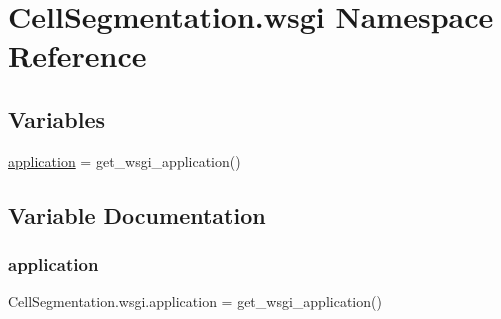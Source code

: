 \hypertarget{namespace_cell_segmentation_1_1wsgi}{}\section{Cell\+Segmentation.\+wsgi Namespace Reference}
\label{namespace_cell_segmentation_1_1wsgi}
\subsection*{Variables}
\begin{DoxyCompactItemize}
\item 
\mbox{\hyperlink{namespace_cell_segmentation_1_1wsgi_ae09dc9003f187d25053773e22660fb2a}{application}} = get\+\_\+wsgi\+\_\+application()
\end{DoxyCompactItemize}


\subsection{Variable Documentation}
\mbox{\label{namespace_cell_segmentation_1_1wsgi_ae09dc9003f187d25053773e22660fb2a}} 
\subsubsection{\texorpdfstring{application}{application}}
{\footnotesize\ttfamily Cell\+Segmentation.\+wsgi.\+application = get\+\_\+wsgi\+\_\+application()}

